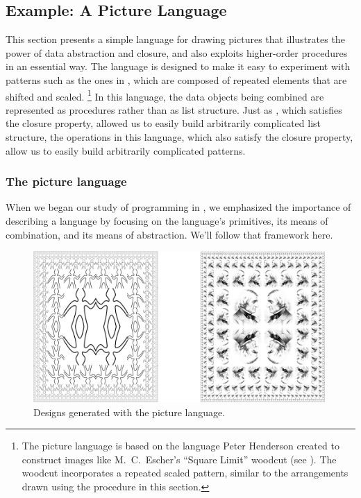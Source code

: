 \subsection{Example: A Picture Language}
\label{Section 2.2.4}

This section presents a simple language for drawing pictures that illustrates the power of data abstraction and closure, and also exploits higher-order procedures in an essential way.
The language is designed to make it easy to experiment with patterns such as the ones in , which are composed of repeated elements that are shifted and scaled.%
\footnote{
	The picture language is based on the language Peter Henderson created to construct images like M.~C.~Escher’s “Square Limit” woodcut (see ).
	The woodcut incorporates a repeated scaled pattern, similar to the arrangements drawn using the  procedure in this section.
}
In this language, the data objects being combined are represented as procedures rather than as list structure.
Just as , which satisfies the closure property, allowed us to easily build arbitrarily complicated list structure, the operations in this language, which also satisfy the closure property, allow us to easily build arbitrarily complicated patterns.



\subsubsection*{The picture language}

When we began our study of programming in , we emphasized the importance of describing a language by focusing on the language’s primitives, its means of combination, and its means of abstraction.
We’ll follow that framework here.

\begin{figure}[tb]
	\centering
	\includegraphics[width=111mm]{fig/chap2/Fig2.9-bigger.png}
	\caption{
		Designs generated with the picture language.
	}
	\label{Figure 2.9}
\end{figure}

